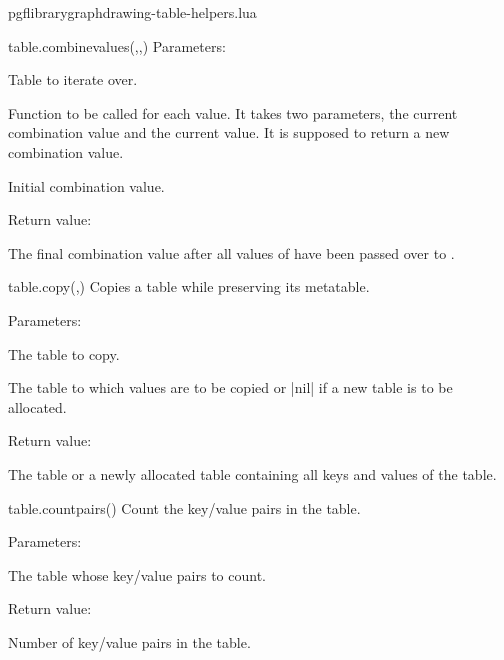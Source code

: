 \begin{filedescription}{pgflibrarygraphdrawing-table-helpers.lua}
\begin{luacommand}{{table.combine\textunderscore{}values}(,,)}
Parameters:
\begin{parameterdescription}
	\item[\meta{input}] Table to iterate over.\item[\meta{combine\_func}] Function to be called for each value. It takes two parameters, the current combination value and the current value. It is supposed to return a new combination value.\item[\meta{initial\_value}] Initial combination value. 
\end{parameterdescription}


Return value:
\begin{parameterdescription} 
  \item[] The final combination value after all values of  have been passed over to . 
\end{parameterdescription}


\end{luacommand}
\begin{luacommand}{{table.copy}(,)}
Copies a table while preserving its metatable. 

Parameters:
\begin{parameterdescription}
	\item[\meta{source}] The table to copy.\item[\meta{target}] The table to which values are to be copied or |nil| if a new table is to be allocated. 
\end{parameterdescription}


Return value:
\begin{parameterdescription} 
  \item[] The  table or a newly allocated table containing all keys and values of the  table. 
\end{parameterdescription}


\end{luacommand}
\begin{luacommand}{{table.count\textunderscore{}pairs}()}
Count the key/value pairs in the table. 

Parameters:
\begin{parameterdescription}
	\item[\meta{input}] The table whose key/value pairs to count. 
\end{parameterdescription}


Return value:
\begin{parameterdescription} 
  \item[] Number of key/value pairs in the table. 
\end{parameterdescription}



\end{luacommand}
\end{filedescription}
